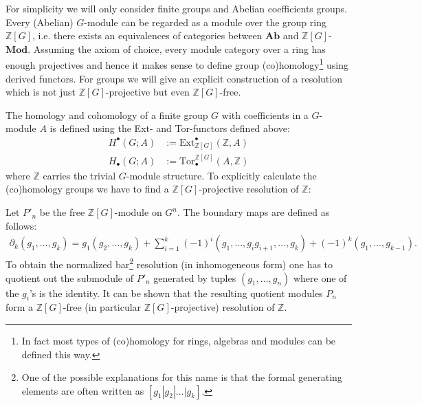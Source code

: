	For simplicity we will only consider finite groups and Abelian coefficients groups. Every (Abelian) $G$-module can be regarded as a module over the group ring $\mathbb{Z}[G]$, i.e. there exists an equivalences of categories between $\mathbf{Ab}$ and $\mathbb{Z}[G]$-$\mathbf{Mod}$. Assuming the axiom of choice, every module category over a ring has enough projectives and hence it makes sense to define group (co)homology\footnote{In fact most types of (co)homology for rings, algebras and modules can be defined this way.} using derived functors. For groups we will give an explicit construction of a resolution which is not just $\mathbb{Z}[G]$-projective but even $\mathbb{Z}[G]$-free.

	The homology and cohomology of a finite group $G$ with coefficients in a $G$-module $A$ is defined using the Ext- and Tor-functors defined above:
	\begin{align}
		H^\bullet(G; A) &:= \text{Ext}_{\mathbb{Z}[G]}^\bullet(\mathbb{Z}, A)\\
		H_\bullet(G; A) &:= \text{Tor}^{\mathbb{Z}[G]}_\bullet(A, \mathbb{Z})
	\end{align}
	where $\mathbb{Z}$ carries the trivial $G$-module structure. To explicitly calculate the (co)homology groups we have to find a $\mathbb{Z}[G]$-projective resolution of $\mathbb{Z}$:
	\begin{construct}
		Let $P'_n$ be the free $\mathbb{Z}[G]$-module on $G^n$. The boundary maps are defined as follows:
		\begin{gather}
			\label{hom_group_boundary}
			\partial_k(g_1, \ldots, g_k) = g_1(g_2, \ldots, g_k) + \sum_{i=1}^k (-1)^i(g_1, \ldots, g_ig_{i+1}, \ldots, g_k) + (-1)^k (g_1, \ldots, g_{k-1}).
		\end{gather}
		To obtain the normalized bar\footnote{One of the possible explanations for this name is that the formal generating elements are often written as $[g_1|g_2|\ldots|g_k]$.} resolution (in inhomogeneous form) one has to quotient out the submodule of $P'_n$ generated by tuples $(g_1,\ldots,g_n)$ where one of the $g_i$'s is the identity. It can be shown that the resulting quotient modules $P_n$ form a $\mathbb{Z}[G]$-free (in particular $\mathbb{Z}[G]$-projective) resolution of $\mathbb{Z}$.
	\end{construct}

